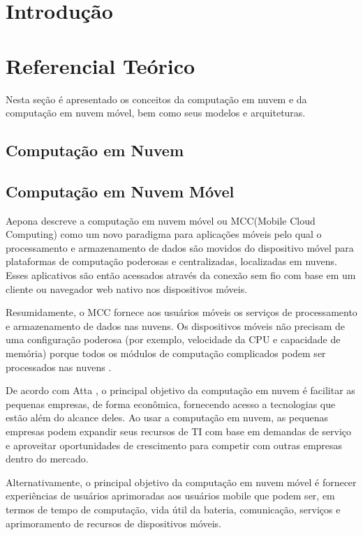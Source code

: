 \documentclass[12pt]{article}
\begin{document}
\section{Introdução}

\lipsum[1]

\section{Referencial Teórico}

Nesta seção é apresentado os conceitos da computação em nuvem e da computação em nuvem
móvel, bem como seus modelos e arquiteturas.

\subsection{Computação em Nuvem}

\subsection{Computação em Nuvem Móvel}

Aepona \cite{aepona2010} descreve a computação em nuvem móvel ou MCC(Mobile Cloud Computing) como um novo paradigma para aplicações 
móveis pelo qual o processamento e armazenamento de dados são movidos do dispositivo móvel para plataformas de computação
poderosas e centralizadas, localizadas em nuvens. Esses aplicativos são então acessados através da conexão sem fio com base em
um cliente ou navegador web nativo nos dispositivos móveis. 

Resumidamente, o MCC fornece aos usuários móveis os serviços de processamento e armazenamento de dados nas nuvens.
Os dispositivos móveis não precisam de uma configuração poderosa (por exemplo, velocidade da CPU e capacidade de memória)
porque todos os módulos de computação complicados podem ser processados nas nuvens \cite{liu2010}.

De acordo com Atta \cite{atta2013}, o principal objetivo da computação em nuvem é facilitar as pequenas empresas,
de forma econômica, fornecendo acesso a tecnologias que estão além do alcance deles. Ao usar a computação em nuvem, 
as pequenas empresas podem expandir seus recursos de TI com base em demandas de serviço e aproveitar oportunidades 
de crescimento para competir com outras empresas dentro do mercado.

Alternativamente, o principal objetivo da computação em nuvem móvel é fornecer experiências de usuários aprimoradas
aos usuários mobile que podem ser, em termos de tempo de computação, vida útil da bateria, comunicação, serviços e 
aprimoramento de recursos de dispositivos móveis.
\end{document}
